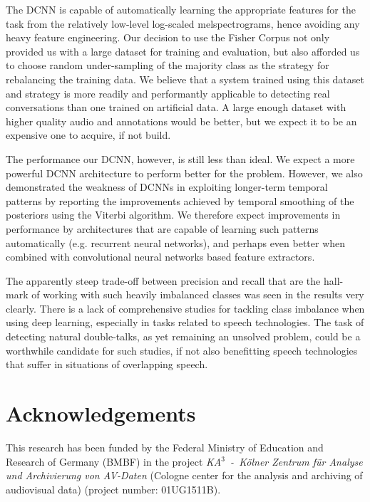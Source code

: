 \documentclass[a4paper]{article}
\begin{document}
The DCNN is capable of automatically learning the appropriate features for the task from the relatively low-level log-scaled melspectrograms, hence avoiding any heavy feature engineering.
Our decision to use the Fisher Corpus not only provided us with a large dataset for training and evaluation,
but also afforded us to choose random under-sampling of the majority class as the strategy for rebalancing the training data.
We believe that a system trained using this dataset and strategy is more readily and performantly applicable to detecting real conversations than one trained on artificial data.
A large enough dataset with higher quality audio and annotations would be better,
but we expect it to be an expensive one to acquire, if not build.

The performance our DCNN, however, is still less than ideal.
We expect a more powerful DCNN architecture to perform better for the problem.
However, we also demonstrated the weakness of DCNNs in exploiting longer-term temporal patterns by reporting the improvements achieved by temporal smoothing of the posteriors using the Viterbi algorithm.
We therefore expect improvements in performance by architectures that are capable of learning such patterns automatically (e.g. recurrent neural networks),
and perhaps even better when combined with convolutional neural networks based feature extractors.

The apparently steep trade-off between precision and recall that are the hall-mark of working with such heavily imbalanced classes was seen in the results very clearly.
There is a lack of comprehensive studies for tackling class imbalance when using deep learning,
especially in tasks related to speech technologies.
The task of detecting natural double-talks, as yet remaining an unsolved problem,
could be a worthwhile candidate for such studies,
if not also benefitting speech technologies that suffer in situations of overlapping speech.


\section{Acknowledgements}
This research has been funded by the Federal Ministry of Education and Research of Germany (BMBF) in the project \textit{KA$^3$~-~K{\"o}lner Zentrum für Analyse und Archivierung von AV-Daten} (Cologne center for the analysis and archiving of audiovisual data) (project number: 01UG1511B). 



\end{document}
